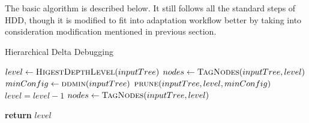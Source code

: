 The basic algorithm is described below. It still follows all the standard steps of HDD, though it is modified to fit into adaptation workflow better by taking into consideration modification mentioned in previous section. 

\begin{algorithm}
\caption{Hierarchical Delta Debugging}
\hrulefill
\begin{algorithmic}[1]
    \State $level\gets\textsc{HigestDepthLevel}(inputTree)$
    \State $nodes\gets\textsc{TagNodes}(inputTree,level)$ 
	\State $minConfig\gets\textsc{ddmin}(inputTree)$
	\State $\textsc{prune}(inputTree,level,minConfig)$
	\State $level = level - 1$
	\State $nodes\gets\textsc{TagNodes}(inputTree,level)$ 	
	\EndWhile

    \State \textbf{return} $level$ 
\EndProcedure
\end{algorithmic}
\hrulefill
\end{algorithm}